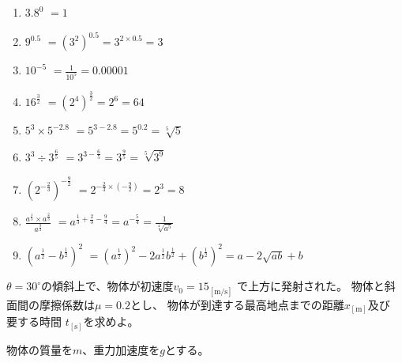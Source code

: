 \documentclass[12pt,b5paper]{ltjsarticle}
\begin{document}
 \begin{enumerate}
  \item $3.8^0$ $=1$
  \item $9^{0.5}$ $=(3^2)^{0.5}=3^{2 \times 0.5} =3$
  \item $10^{-5}$ $=\frac{1}{10^5}=0.00001$
  \item $16^{\frac{3}{2}}$ $=(2^4)^{\frac{3}{2}} = 2^6 = 64$
  \item $5^3 \times 5^{-2.8}$ $=5^{3-2.8}=5^{0.2} =\sqrt[5]{5}$
  \item $3^3 \div 3^{\frac{6}{5}}$ $=3^{3-\frac{6}{5}}=3^{\frac{9}{5}} =\sqrt[5]{3^9}$
  \item $\left(2^{-\frac{2}{3}}\right)^{-\frac{9}{2}}$
        $=2^{{-\frac{2}{3}} \times (-\frac{9}{2})}=2^3=8$
  \item $\displaystyle \frac{a^{\frac{1}{3}}\times a^{\frac{2}{3}}}{a^{\frac{9}{4}}}$
        $= a^{ \frac{1}{3} + \frac{2}{3} - \frac{9}{4} } = a^{-\frac{5}{4}} = \frac{1}{\sqrt[4]{a^5}}$
  \item $\left( a^{\frac{1}{2}} - b^{\frac{1}{2}} \right)^2$
        $= (a^{\frac{1}{2}})^2 -2a^{\frac{1}{2}} b^{\frac{1}{2}} + (b^{\frac{1}{2}})^2 = a-2\sqrt{ab} + b$
 \end{enumerate}


\hrulefill

$\theta = 30^{\circ}$の傾斜上で、物体が初速度$v_0 = 15_\mathrm{[m/s]}$ で上方に発射された。
物体と斜面間の摩擦係数は$\mu = 0.2$とし、
物体が到達する最高地点までの距離$x_\mathrm{[m]}$及び
要する時間 $t_\mathrm{[s]}$を求めよ。

\begin{center}
\end{center}


物体の質量を$m$、重力加速度を$g$とする。
\end{document}

